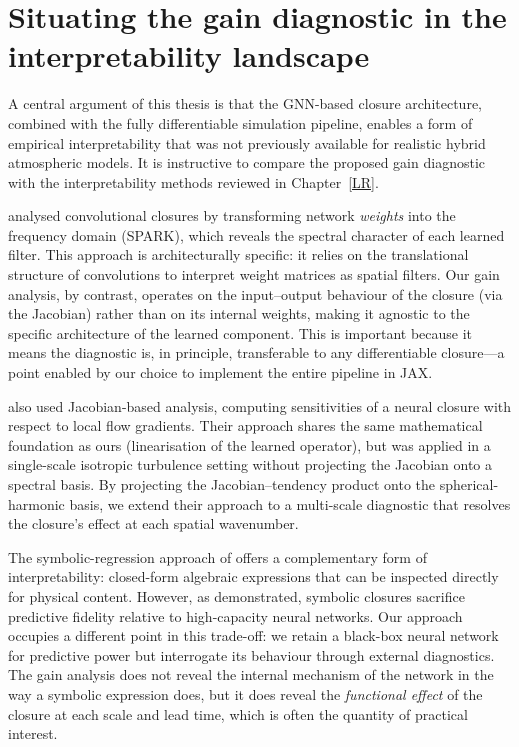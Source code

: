 \section{Situating the gain diagnostic in the interpretability landscape}

A central argument of this thesis is that the GNN-based closure architecture, combined with the fully differentiable simulation pipeline, enables a form of empirical interpretability that was not previously available for realistic hybrid atmospheric models. It is instructive to compare the proposed gain diagnostic with the interpretability methods reviewed in Chapter~\ref{LR}.

\citet{subel2023explaining} analysed convolutional closures by transforming network \emph{weights} into the frequency domain (SPARK), which reveals the spectral character of each learned filter. This approach is architecturally specific: it relies on the translational structure of convolutions to interpret weight matrices as spatial filters. Our gain analysis, by contrast, operates on the input--output behaviour of the closure (via the Jacobian) rather than on its internal weights, making it agnostic to the specific architecture of the learned component. This is important because it means the diagnostic is, in principle, transferable to any differentiable closure---a point enabled by our choice to implement the entire pipeline in JAX.

\citet{Portwood2021} also used Jacobian-based analysis, computing sensitivities of a neural closure with respect to local flow gradients. Their approach shares the same mathematical foundation as ours (linearisation of the learned operator), but was applied in a single-scale isotropic turbulence setting without projecting the Jacobian onto a spectral basis. By projecting the Jacobian--tendency product onto the spherical-harmonic basis, we extend their approach to a multi-scale diagnostic that resolves the closure's effect at each spatial wavenumber.

The symbolic-regression approach of \citet{zanna2020data} offers a complementary form of interpretability: closed-form algebraic expressions that can be inspected directly for physical content. However, as \citet{ross2023benchmarking} demonstrated, symbolic closures sacrifice predictive fidelity relative to high-capacity neural networks. Our approach occupies a different point in this trade-off: we retain a black-box neural network for predictive power but interrogate its behaviour through external diagnostics. The gain analysis does not reveal the internal mechanism of the network in the way a symbolic expression does, but it does reveal the \emph{functional effect} of the closure at each scale and lead time, which is often the quantity of practical interest.

